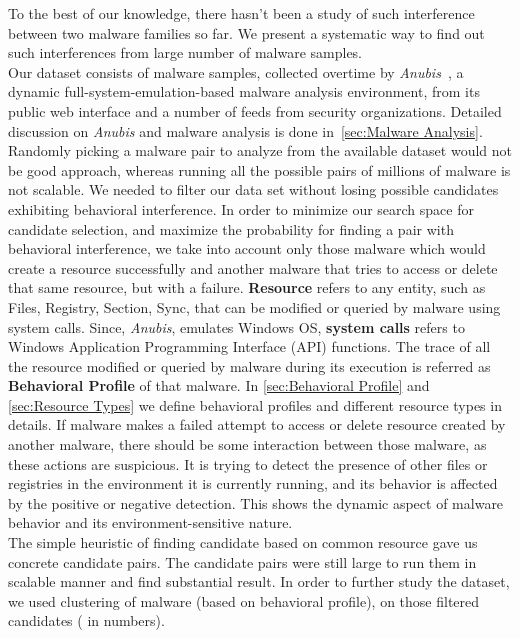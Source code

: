 To the best of our knowledge, there hasn't been a study of such interference between two malware families so far.
We present a systematic way to find out such interferences from large number of malware samples.\\
Our dataset consists of {\gettotalmalwarei{}} malware samples, collected overtime by \emph{Anubis}~\cite[]{anubis}, a dynamic full-system-emulation-based malware analysis environment, from its public web interface and a number of feeds from security organizations.
Detailed discussion on \emph{Anubis} and malware analysis is done in~\autoref{sec:Malware Analysis}.
Randomly picking a malware pair to analyze from the available dataset would not be good approach, whereas running all the possible pairs of millions of malware is not scalable.
We needed to filter our data set without losing possible candidates exhibiting behavioral interference.
In order to minimize our search space for candidate selection, and maximize the probability for finding a pair with behavioral interference, we take into account only those malware which would create a resource successfully and another malware that tries to access or delete that same resource, but with a failure.
\textbf{Resource} refers to any entity, such as Files, Registry, Section, Sync, that can be modified or queried by malware using system calls.
Since, \emph{Anubis}, emulates Windows OS, \textbf{system calls} refers to Windows Application Programming Interface (API) functions.
The trace of all the resource modified or queried by malware during its execution is referred as \textbf{Behavioral Profile} of that malware.
In \autoref{sec:Behavioral Profile} and \autoref{sec:Resource Types} we define behavioral profiles and different resource types in details.
If malware makes a failed attempt to access or delete resource created by another malware, there should be some interaction between those malware, as these actions are suspicious.
It is trying to detect the presence of other files or registries in the environment it is currently running, and its behavior is affected by the positive or negative detection.
This shows the dynamic aspect of malware behavior and its environment-sensitive nature.\\
The simple heuristic of finding candidate based on common resource gave us concrete candidate pairs.
The candidate pairs were still large to run them in scalable manner and find substantial result.
In order to further study the dataset, we used clustering of malware (based on behavioral profile), on those filtered candidates (\gettotalmalwareiii{} in numbers).
